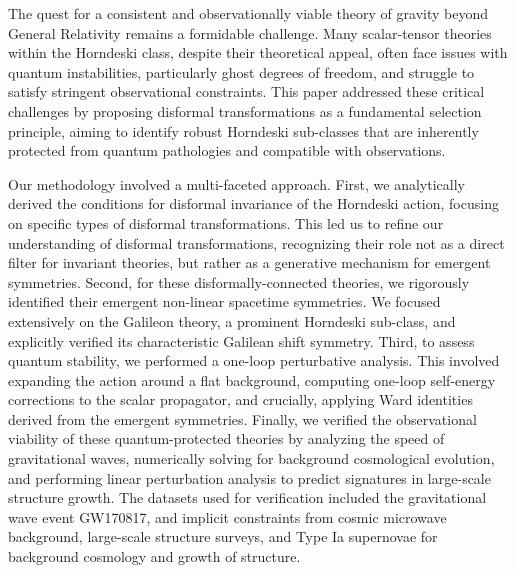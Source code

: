 \documentclass[twocolumn]{aastex631}
\begin{document}
The quest for a consistent and observationally viable theory of gravity beyond General Relativity remains a formidable challenge. Many scalar-tensor theories within the Horndeski class, despite their theoretical appeal, often face issues with quantum instabilities, particularly ghost degrees of freedom, and struggle to satisfy stringent observational constraints. This paper addressed these critical challenges by proposing disformal transformations as a fundamental selection principle, aiming to identify robust Horndeski sub-classes that are inherently protected from quantum pathologies and compatible with observations.

Our methodology involved a multi-faceted approach. First, we analytically derived the conditions for disformal invariance of the Horndeski action, focusing on specific types of disformal transformations. This led us to refine our understanding of disformal transformations, recognizing their role not as a direct filter for invariant theories, but rather as a generative mechanism for emergent symmetries. Second, for these disformally-connected theories, we rigorously identified their emergent non-linear spacetime symmetries. We focused extensively on the Galileon theory, a prominent Horndeski sub-class, and explicitly verified its characteristic Galilean shift symmetry. Third, to assess quantum stability, we performed a one-loop perturbative analysis. This involved expanding the action around a flat background, computing one-loop self-energy corrections to the scalar propagator, and crucially, applying Ward identities derived from the emergent symmetries. Finally, we verified the observational viability of these quantum-protected theories by analyzing the speed of gravitational waves, numerically solving for background cosmological evolution, and performing linear perturbation analysis to predict signatures in large-scale structure growth. The datasets used for verification included the gravitational wave event GW170817, and implicit constraints from cosmic microwave background, large-scale structure surveys, and Type Ia supernovae for background cosmology and growth of structure.
\end{document}
